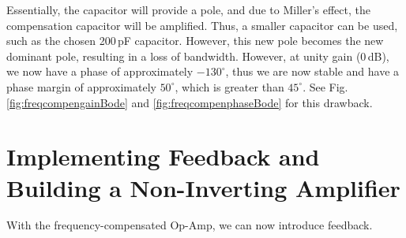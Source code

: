 \documentclass[lettersize,journal]{IEEEtran}
\begin{document}
Essentially, the capacitor will provide a pole, and due to Miller's effect, 
the compensation capacitor will be amplified. Thus, a smaller capacitor can 
be used, such as the chosen 200$\,$pF capacitor.
However, this new pole becomes the new dominant pole, resulting in a loss of 
bandwidth. However, at unity gain (0$\,$dB), we now have a phase of 
approximately $-130^\circ$, thus we are now stable and have a phase margin of 
approximately $50^\circ$, which is
greater than $45^\circ$. See Fig. \ref{fig:freqcompengainBode} and \ref{fig:freqcompenphaseBode} 
for this drawback.

\section{Implementing Feedback and Building a Non-Inverting Amplifier}
With the frequency-compensated Op-Amp, we can now introduce feedback. 

\IEEEpubidadjcol
\end{document}

